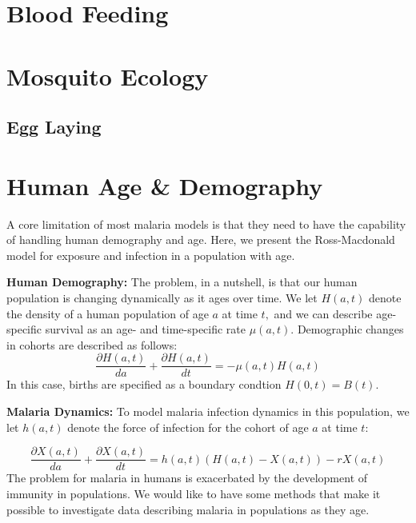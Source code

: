 \documentclass[
]{book}
\begin{document}
\chapter{Blood Feeding}\label{blood-feeding}

\section{}\label{section-1}

\chapter{Mosquito Ecology}\label{mosquito-ecology-1}

\section{Egg Laying}\label{egg-laying}

\chapter{Human Age \& Demography}\label{human-age-demography}

A core limitation of most malaria models is that they need to have the capability of handling human demography and age. Here, we present the Ross-Macdonald model for exposure and infection in a population with age.

\textbf{Human Demography:} The problem, in a nutshell, is that our human population is changing dynamically as it ages over time. We let \(H(a,t)\) denote the density of a human population of age \(a\) at time \(t,\) and we can describe age-specific survival as an age- and time-specific rate \(\mu(a,t).\) Demographic changes in cohorts are described as follows:\\
\[
\frac{\partial H(a,t)}{da} + \frac{\partial H(a,t)}{dt} = -\mu(a,t) H(a,t)
\]
In this case, births are specified as a boundary condtion \(H(0,t) = B(t).\)

\textbf{Malaria Dynamics:} To model malaria infection dynamics in this population, we let \(h(a,t)\) denote the force of infection for the cohort of age \(a\) at time \(t\):

\[
\frac{\partial X(a,t)}{da} + \frac{\partial X(a,t)}{dt} = h(a,t) \left(H(a,t) - X(a,t) \right) - r X(a,t)
\]
The problem for malaria in humans is exacerbated by the development of immunity in populations. We would like to have some methods that make it possible to investigate data describing malaria in populations as they age.
\end{document}
